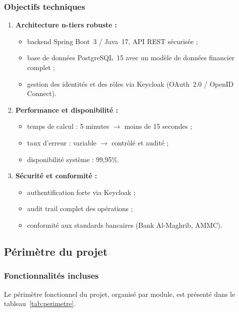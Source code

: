 \subsubsection{Objectifs techniques}

\begin{enumerate}
    \item \textbf{Architecture n-tiers robuste :}
    \begin{itemize}
        \item backend Spring Boot~3 / Java~17, API REST sécurisée ;
        \item base de données PostgreSQL~15 avec un modèle de données financier complet ;
        \item gestion des identités et des rôles via Keycloak (OAuth~2.0 / OpenID Connect).
    \end{itemize}
    \item \textbf{Performance et disponibilité :}
    \begin{itemize}
        \item temps de calcul : 5 minutes $\rightarrow$ moins de 15 secondes ;
        \item taux d'erreur : variable $\rightarrow$ contrôlé et audité ;
        \item disponibilité système : 99,95\%.
    \end{itemize}
    \item \textbf{Sécurité et conformité :}
    \begin{itemize}
        \item authentification forte via Keycloak ;
        \item audit trail complet des opérations ;
        \item conformité aux standards bancaires (Bank Al-Maghrib, AMMC).
    \end{itemize}
\end{enumerate}

\subsection{Périmètre du projet}

\subsubsection{Fonctionnalités incluses}

\hspace{1cm} Le périmètre fonctionnel du projet, organisé par module, est présenté dans le tableau~\ref{tab:perimetre}.

